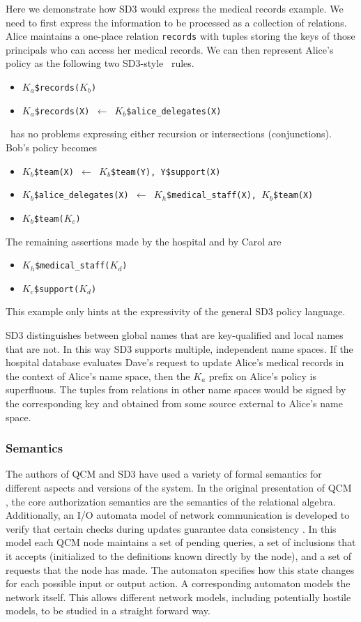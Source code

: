 Here we demonstrate how SD3 would express the medical records example. We
need to first express the information to be processed as a collection of
relations. Alice maintains a one-place relation
\texttt{records} with tuples storing the keys of those principals who can
access her medical records. We can then represent Alice's policy as the
following two SD3-style \datalog\ rules.
\begin{itemize}
\item \texttt{$K_a$\$records($K_b$)}
\item \texttt{$K_a$\$records(X) $\leftarrow$ $K_b$\$alice\_delegates(X)}
\end{itemize}
\datalog\ has no problems expressing either recursion or intersections
(conjunctions). Bob's policy becomes
\begin{itemize}
\item \texttt{$K_b$\$team(X) $\leftarrow$ $K_b$\$team(Y), Y\$support(X)}
\item \texttt{$K_b$\$alice\_delegates(X) $\leftarrow$ $K_h$\$medical\_staff(X), $K_b$\$team(X)}
\item \texttt{$K_b$\$team($K_c$)}
\end{itemize}
The remaining assertions made by the hospital and by Carol are
\begin{itemize}
\item \texttt{$K_h$\$medical\_staff($K_d$)}
\item \texttt{$K_c$\$support($K_d$)}
\end{itemize}
This example only hints at the expressivity of the general SD3 policy
language.

SD3 distinguishes between global names that are key-qualified and local
names that are not. In this way SD3 supports multiple, independent name
spaces. If the hospital database evaluates Dave's request to update Alice's
medical records in the context of Alice's name space, then the $K_a$ prefix
on Alice's policy is superfluous. The tuples from relations in other name
spaces would be signed by the corresponding key and obtained from some
source external to Alice's name space.

\subsubsection{Semantics} The authors of QCM and SD3 have used 
a variety of formal semantics for different aspects and versions of
the system.  In the original presentation of QCM \cite{Gunter:DALSI},
the core authorization semantics are the semantics of the relational
algebra.  Additionally, an I/O automata model of network communication
is developed to verify that certain checks during updates guarantee
data consistency \cite{Gunter:ADDUQCM}.  In this model each QCM node
maintains a set of pending queries, a set of inclusions that it
accepts (initialized to the definitions known directly by the node),
and a set of requests that the node has made. The automaton specifies
how this state changes for each possible input or output action. A
corresponding automaton models the network itself. This allows
different network models, including potentially hostile models, to be
studied in a straight forward way.

